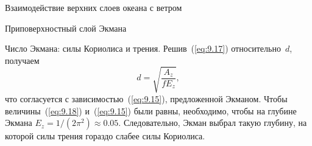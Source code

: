 \begin{chapter}{Взаимодействие верхних слоев океана с ветром}
\begin{section}{Приповерхностный слой Экмана}
\begin{paragraph}{Число Экмана: силы Кориолиса и трения.}
Решив~(\ref{eq:9.17}) относительно~$d$, получаем
\begin{equation}\label{eq:9.18}
 d = \sqrt{\frac{A_z}{fE_z}},
\end{equation}
что согласуется с зависимостью~(\ref{eq:9.15}), предложенной Экманом.
Чтобы величины~(\ref{eq:9.18}) и~(\ref{eq:9.15}) были равны, необходимо, чтобы 
на глубине Экмана $E_z = 1/(2\pi^2) \approx 0.05$. Следовательно, 
Экман выбрал такую глубину, на которой силы трения гораздо слабее силы 
Кориолиса.
%
\end{paragraph}


\end{section}
\end{chapter}

